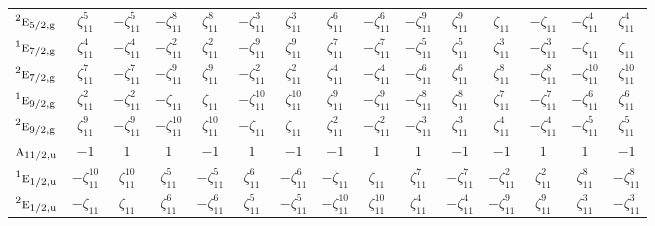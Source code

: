\documentclass[10pt,a4paper]{article}
\numberwithin{equation}{section}
\newcommand{\irr}[1]{\text{\normalfont\scshape #1}}
\newcommand{\conjpair}[1]{{}^{#1}}
\newcommand{\ptag}[1]{\mathrm{#1}}
\newcommand{\rootunity}[1]{\zeta_{#1}}
\begin{document}
{\begin{longtable}{@{}lcccccccccccccc@{}}
$\conjpair{2}\irr{e}_{5/2,\ptag{g}}$ & $\rootunity{11}^{5}$ & $-\rootunity{11}^{5}$ & $-\rootunity{11}^{8}$ & $\rootunity{11}^{8}$ & $-\rootunity{11}^{3}$ & $\rootunity{11}^{3}$ & $\rootunity{11}^{6}$ & $-\rootunity{11}^{6}$ & $-\rootunity{11}^{9}$ & $\rootunity{11}^{9}$ & $\rootunity{11}$ & $-\rootunity{11}$ & $-\rootunity{11}^{4}$ & $\rootunity{11}^{4}$\\
$\conjpair{1}\irr{e}_{7/2,\ptag{g}}$ & $\rootunity{11}^{4}$ & $-\rootunity{11}^{4}$ & $-\rootunity{11}^{2}$ & $\rootunity{11}^{2}$ & $-\rootunity{11}^{9}$ & $\rootunity{11}^{9}$ & $\rootunity{11}^{7}$ & $-\rootunity{11}^{7}$ & $-\rootunity{11}^{5}$ & $\rootunity{11}^{5}$ & $\rootunity{11}^{3}$ & $-\rootunity{11}^{3}$ & $-\rootunity{11}$ & $\rootunity{11}$\\
$\conjpair{2}\irr{e}_{7/2,\ptag{g}}$ & $\rootunity{11}^{7}$ & $-\rootunity{11}^{7}$ & $-\rootunity{11}^{9}$ & $\rootunity{11}^{9}$ & $-\rootunity{11}^{2}$ & $\rootunity{11}^{2}$ & $\rootunity{11}^{4}$ & $-\rootunity{11}^{4}$ & $-\rootunity{11}^{6}$ & $\rootunity{11}^{6}$ & $\rootunity{11}^{8}$ & $-\rootunity{11}^{8}$ & $-\rootunity{11}^{10}$ & $\rootunity{11}^{10}$\\
$\conjpair{1}\irr{e}_{9/2,\ptag{g}}$ & $\rootunity{11}^{2}$ & $-\rootunity{11}^{2}$ & $-\rootunity{11}$ & $\rootunity{11}$ & $-\rootunity{11}^{10}$ & $\rootunity{11}^{10}$ & $\rootunity{11}^{9}$ & $-\rootunity{11}^{9}$ & $-\rootunity{11}^{8}$ & $\rootunity{11}^{8}$ & $\rootunity{11}^{7}$ & $-\rootunity{11}^{7}$ & $-\rootunity{11}^{6}$ & $\rootunity{11}^{6}$\\
$\conjpair{2}\irr{e}_{9/2,\ptag{g}}$ & $\rootunity{11}^{9}$ & $-\rootunity{11}^{9}$ & $-\rootunity{11}^{10}$ & $\rootunity{11}^{10}$ & $-\rootunity{11}$ & $\rootunity{11}$ & $\rootunity{11}^{2}$ & $-\rootunity{11}^{2}$ & $-\rootunity{11}^{3}$ & $\rootunity{11}^{3}$ & $\rootunity{11}^{4}$ & $-\rootunity{11}^{4}$ & $-\rootunity{11}^{5}$ & $\rootunity{11}^{5}$\\
$\irr{a}_{11/2,\ptag{u}}$ & $-1$ & $1$ & $1$ & $-1$ & $1$ & $-1$ & $-1$ & $1$ & $1$ & $-1$ & $-1$ & $1$ & $1$ & $-1$\\
$\conjpair{1}\irr{e}_{1/2,\ptag{u}}$ & $-\rootunity{11}^{10}$ & $\rootunity{11}^{10}$ & $\rootunity{11}^{5}$ & $-\rootunity{11}^{5}$ & $\rootunity{11}^{6}$ & $-\rootunity{11}^{6}$ & $-\rootunity{11}$ & $\rootunity{11}$ & $\rootunity{11}^{7}$ & $-\rootunity{11}^{7}$ & $-\rootunity{11}^{2}$ & $\rootunity{11}^{2}$ & $\rootunity{11}^{8}$ & $-\rootunity{11}^{8}$\\
$\conjpair{2}\irr{e}_{1/2,\ptag{u}}$ & $-\rootunity{11}$ & $\rootunity{11}$ & $\rootunity{11}^{6}$ & $-\rootunity{11}^{6}$ & $\rootunity{11}^{5}$ & $-\rootunity{11}^{5}$ & $-\rootunity{11}^{10}$ & $\rootunity{11}^{10}$ & $\rootunity{11}^{4}$ & $-\rootunity{11}^{4}$ & $-\rootunity{11}^{9}$ & $\rootunity{11}^{9}$ & $\rootunity{11}^{3}$ & $-\rootunity{11}^{3}$\\

\end{longtable}}
\end{document}
